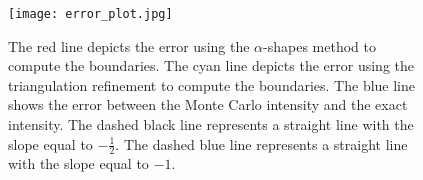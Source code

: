 \begin{figure}[h!]
 \begin{center}
   \texttt{[image: error\_plot.jpg]}
    \end{center}
     \caption{\footnotesize{ The red line depicts the error using the $\alpha$-shapes method to compute the boundaries. The cyan line depicts the error using the triangulation refinement to compute the boundaries.
     The blue line shows the error between the Monte Carlo intensity and the exact intensity.
     The dashed black line represents a straight line with the slope equal to $-\frac{1}{2}$.
   The dashed blue line represents a straight line with the slope equal to $-1$.}}
 \label{fig:error2}
\end{figure}









































